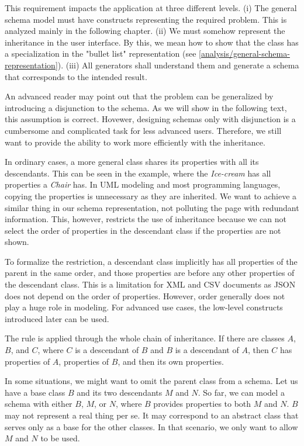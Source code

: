 This requirement impacts the application at three different levels. (i) The general schema model must have constructs representing the required problem. This is analyzed mainly in the following chapter. (ii) We must somehow represent the inheritance in the user interface. By this, we mean how to show that the class has a specialization in the "bullet list" representation (see \autoref{analysis/general-schema-representation}). (iii) All generators shall understand them and generate a schema that corresponds to the intended result.

\medskip

An advanced reader may point out that the problem can be generalized by introducing a disjunction to the schema. As we will show in the following text, this assumption is correct. Hovewer, designing schemas only with disjunction is a cumbersome and complicated task for less advanced users. Therefore, we still want to provide the ability to work more efficiently with the inheritance.

In ordinary cases, a more general class shares its properties with all its descendants. This can be seen in the example, where the \textit{Ice-cream} has all properties a \textit{Chair} has. In UML modeling and most programming languages, copying the properties is unnecessary as they are inherited. We want to achieve a similar thing in our schema representation, not polluting the page with redundant information. This, however, restricts the use of inheritance because we can not select the order of properties in the descendant class if the properties are not shown.

To formalize the restriction, a descendant class implicitly has all properties of the parent in the same order, and those properties are before any other properties of the descendant class. This is a limitation for XML and CSV documents as JSON does not depend on the order of properties. However, order generally does not play a huge role in modeling. For advanced use cases, the low-level constructs introduced later can be used.

The rule is applied through the whole chain of inheritance. If there are classes $A$, $B$, and $C$, where $C$ is a descendant of $B$ and $B$ is a descendant of $A$, then $C$ has properties of $A$, properties of $B$, and then its own properties.

In some situations, we might want to omit the parent class from a schema. Let us have a base class $B$ and its two descendants $M$ and $N$. So far, we can model a schema with either $B$, $M$, or $N$, where $B$ provides properties to both $M$ and $N$. $B$ may not represent a real thing per se. It may correspond to an abstract class that serves only as a base for the other classes. In that scenario, we only want to allow $M$ and $N$ to be used.

